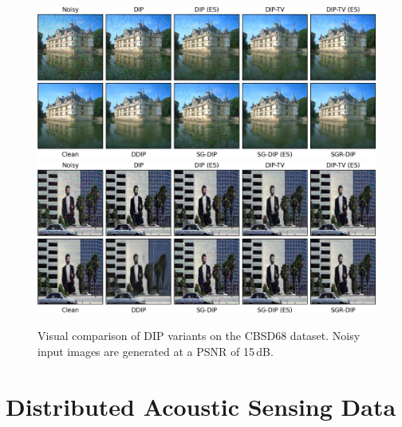 \begin{figure}
    \centering
    \includegraphics[width=\textwidth]{img/fig_6.2_1.png}\\
    \vspace{20pt}
    \includegraphics[width=\textwidth]{img/fig_6.2_2.png}
    \caption{
        Visual comparison of DIP variants on the CBSD68 dataset.
        Noisy input images are generated at a PSNR of 15\,dB.
    }\label{fig:CBSD68}
\end{figure}

\section{Distributed Acoustic Sensing Data}
